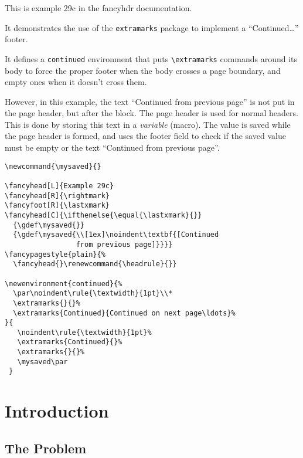\documentclass{report}
\newcommand{\mysaved}{}
\begin{document}
\tableofcontents

\thispagestyle{plain}
\noindent
\begin{boxedminipage}{\textwidth}
This is example 29c in the fancyhdr documentation.

It demonstrates the use of the \texttt{extramarks} package to implement
a ``Continued\ldots'' footer.

It defines a \texttt{continued} environment that puts \verb|\extramarks| commands around its body to force the proper footer when the body crosses a page boundary, and empty ones when it doesn't cross them.

However, in this example, the text ``Continued from previous page'' is not put in the page header, but after the block. The page header is used for normal headers. This is done by storing this text in a \emph{variable} (macro). The value is saved while the page header is formed, and uses the footer field to check if the saved value must be empty or the text ``Continued from previous page''.

\begin{verbatim}
\newcommand{\mysaved}{}

\fancyhead[L]{Example 29c}
\fancyhead[R]{\rightmark}
\fancyfoot[R]{\lastxmark}
\fancyhead[C]{\ifthenelse{\equal{\lastxmark}{}}
  {\gdef\mysaved{}}
  {\gdef\mysaved{\\[1ex]\noindent\textbf{[Continued
                 from previous page]}}}}
\fancypagestyle{plain}{%
  \fancyhead{}\renewcommand{\headrule}{}}

\newenvironment{continued}{%
  \par\noindent\rule{\textwidth}{1pt}\\*
  \extramarks{}{}%
  \extramarks{Continued}{Continued on next page\ldots}%
}{
   \noindent\rule{\textwidth}{1pt}%
   \extramarks{Continued}{}%
   \extramarks{}{}%
   \mysaved\par
 }
\end{verbatim}

\end{boxedminipage}

\pagestyle{fancy}

\newpage
{}
\chapter{Introduction}

\lipsum[1-4]

\section{The Problem}
\label{sec:problem}
\end{document}
